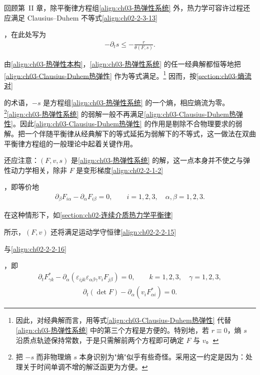 ﻿\documentclass[../../main.tex]{subfiles}
\begin{document}
回顾第~II 章，除平衡律方程组\eqref{align:ch03-热弹性系统} 外，热力学可容许过程还应满足 Clausius--Duhem 不等式\eqref{align:ch02-2-3-13}%

，在此处写为
\begin{align}
-\partial_{t}s\leqslant-\frac{r}{\theta(F,s)}.
\label{align:ch03-Clausius-Duhem热弹性}
\end{align}

由\eqref{align:ch03-热弹性本构}，\eqref{align:ch03-热弹性系统} 的任一经典解都恒等地把\eqref{align:ch03-Clausius-Duhem热弹性} 作为等式满足。\footnote{因此，对经典解而言，用等式\eqref{align:ch03-Clausius-Duhem热弹性} 代替\eqref{align:ch03-热弹性系统} 中的第三个方程是方便的。特别地，若 $r\equiv0$，熵 $s$ 沿质点轨迹保持常数，于是只需解前两个方程即可确定 $F$ 与 $v$。} 因而，按\cref{section:ch03-熵流对}%

的术语，$-s$ 是方程组\eqref{align:ch03-热弹性系统} 的一个熵，相应熵流为零。\footnote{把 $-s$ 而非物理熵 $s$ 本身识别为"熵"似乎有些奇怪。采用这一约定是因为：处理关于时间单调不增的解泛函更为方便。}\eqref{align:ch03-热弹性系统} 的弱解一般不再满足\eqref{align:ch03-Clausius-Duhem热弹性}。因此\eqref{align:ch03-Clausius-Duhem热弹性} 的作用是剔除不合物理要求的弱解。把一个伴随平衡律从经典解下的等式延拓为弱解下的不等式，这一做法在双曲平衡律方程组的一般理论中起着关键作用。

还应注意：$(F,v,s)$ 是\eqref{align:ch03-热弹性系统} 的解，这一点本身并不使之与弹性动力学相关，除非 $F$ 是变形梯度\eqref{align:ch02-2-1-2}%

，即等价地
\begin{align}
\partial_{\beta}F_{i\alpha}-\partial_{\alpha}F_{i\beta}=0,\qquad i=1,2,3,\quad \alpha,\beta=1,2,3.
\label{align:ch03-协调方程}
\end{align}

在这种情形下，如\cref{section:ch02-连续介质热力学平衡律}%

所示，$(F,v)$ 还将满足运动学守恒律\eqref{align:ch02-2-2-15}%

与\eqref{align:ch02-2-2-16}%

，即
\begin{align}
\partial_{t}F_{\gamma k}^{*}-\partial_{\alpha}\left(\varepsilon_{ijk}\varepsilon_{\alpha\beta\gamma}v_{i}F_{j\beta}\right)=0,\qquad k=1,2,3,\quad \gamma=1,2,3,
\label{align:ch03-余因子守恒}
\end{align}
\begin{align}
\partial_{t}(\det F)-\partial_{\alpha}\left(v_{i}F_{\alpha i}^{*}\right)=0.
\label{align:ch03-行列式守恒}
\end{align}
\end{document}
